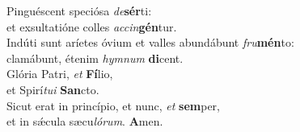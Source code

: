 \oddverse Pinguéscent speciósa \textit{de}\textbf{sér}ti:~\*\\
\oddverse et exsultatióne colles \textit{ac}\textit{cin}\textbf{gén}tur.\\
\evenverse Indúti sunt aríetes óvium et valles abundábunt \textit{fru}\textbf{mén}to:~\*\\
\evenverse clamábunt, étenim \textit{hym}\textit{num} \textbf{di}cent.\\
\oddverse Glória Patri, \textit{et} \textbf{Fí}lio,~\*\\
\oddverse et Spirí\textit{tu}\textit{i} \textbf{San}cto.\\
\evenverse Sicut erat in princípio, et nunc, \textit{et} \textbf{sem}per,~\*\\
\evenverse et in sǽcula sæcu\textit{ló}\textit{rum}. \textbf{A}men.\\
